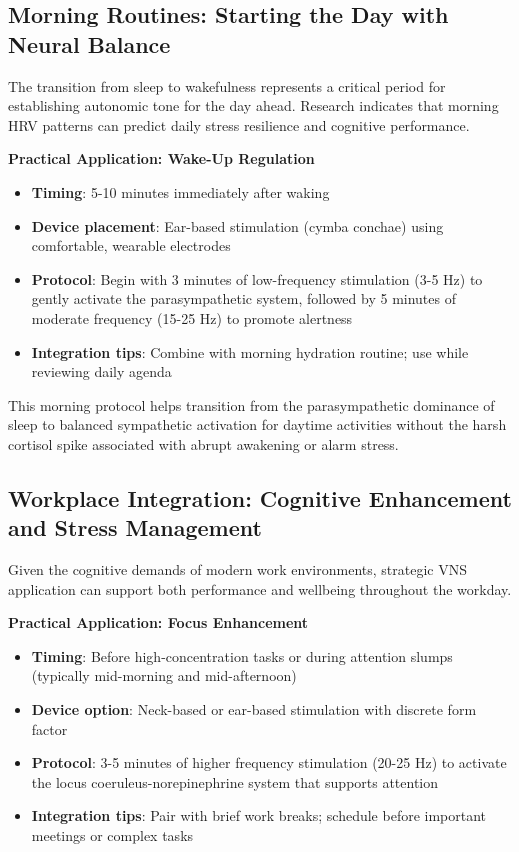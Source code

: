 \documentclass[
  Letterpaper,
]{scrbook}
\providecommand{\tightlist}{%
  \setlength{\itemsep}{0pt}\setlength{\parskip}{0pt}}\usepackage{longtable,booktabs,array}
\begin{document}
\subsection{Morning Routines: Starting the Day with Neural
Balance}\label{morning-routines-starting-the-day-with-neural-balance}

The transition from sleep to wakefulness represents a critical period
for establishing autonomic tone for the day ahead. Research indicates
that morning HRV patterns can predict daily stress resilience and
cognitive performance.

\textbf{Practical Application: Wake-Up Regulation}

\begin{itemize}
\tightlist
\item
  \textbf{Timing}: 5-10 minutes immediately after waking
\item
  \textbf{Device placement}: Ear-based stimulation (cymba conchae) using
  comfortable, wearable electrodes
\item
  \textbf{Protocol}: Begin with 3 minutes of low-frequency stimulation
  (3-5 Hz) to gently activate the parasympathetic system, followed by 5
  minutes of moderate frequency (15-25 Hz) to promote alertness
\item
  \textbf{Integration tips}: Combine with morning hydration routine; use
  while reviewing daily agenda
\end{itemize}

This morning protocol helps transition from the parasympathetic
dominance of sleep to balanced sympathetic activation for daytime
activities without the harsh cortisol spike associated with abrupt
awakening or alarm stress.

\subsection{Workplace Integration: Cognitive Enhancement and Stress
Management}\label{workplace-integration-cognitive-enhancement-and-stress-management}

Given the cognitive demands of modern work environments, strategic VNS
application can support both performance and wellbeing throughout the
workday.

\textbf{Practical Application: Focus Enhancement}

\begin{itemize}
\tightlist
\item
  \textbf{Timing}: Before high-concentration tasks or during attention
  slumps (typically mid-morning and mid-afternoon)
\item
  \textbf{Device option}: Neck-based or ear-based stimulation with
  discrete form factor
\item
  \textbf{Protocol}: 3-5 minutes of higher frequency stimulation (20-25
  Hz) to activate the locus coeruleus-norepinephrine system that
  supports attention
\item
  \textbf{Integration tips}: Pair with brief work breaks; schedule
  before important meetings or complex tasks
\end{itemize}
\end{document}
